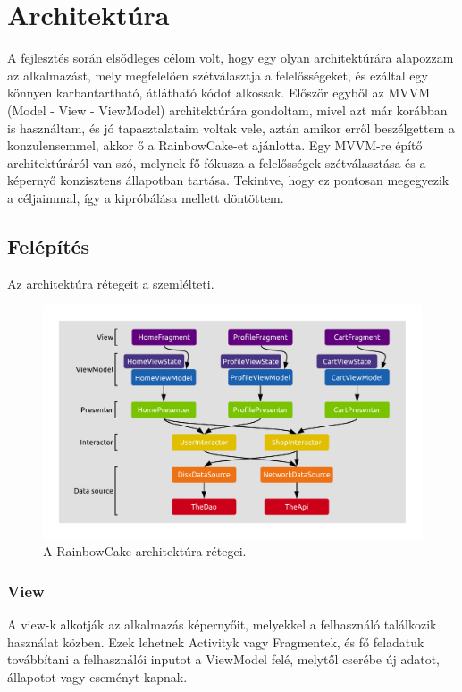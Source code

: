 \chapter{Architektúra}


A fejlesztés során elsődleges célom volt, hogy egy olyan architektúrára alapozzam az alkalmazást, mely megfelelően szétválasztja a felelősségeket, és ezáltal egy könnyen karbantartható, átlátható kódot alkossak. Először egyből az MVVM (Model - View - ViewModel) architektúrára gondoltam, mivel azt már korábban is használtam, és jó tapasztalataim voltak vele, aztán amikor erről beszélgettem a konzulensemmel, akkor ő a RainbowCake-et\cite{Rainbowcake} ajánlotta. Egy MVVM-re építő architektúráról van szó, melynek fő fókusza a felelősségek szétválasztása és a képernyő konzisztens állapotban tartása. Tekintve, hogy ez pontosan megegyezik a céljaimmal, így a kipróbálása mellett döntöttem.

\section{Felépítés}

Az architektúra rétegeit a  szemlélteti.

\begin{figure}[!ht]
	\centering
	\includegraphics[width=150mm, keepaspectratio]{figures/final-architecture.png}
	\caption{A RainbowCake architektúra rétegei.}
	\label{fig:RainbowCakeLayers}
\end{figure}

\subsection{View}
A view-k alkotják az alkalmazás képernyőit, melyekkel a felhasználó találkozik használat közben. Ezek lehetnek Activityk vagy Fragmentek, és fő feladatuk továbbítani a felhasználói inputot a ViewModel felé, melytől cserébe új adatot, állapotot vagy eseményt kapnak. 

